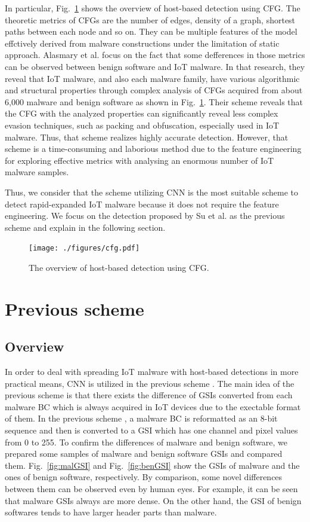 \documentclass{ieeeaccess}
\newcommand{\myfigurename}{Fig.}
\begin{document}
In particular, \myfigurename~\ref{fig:cfg} shows the overview of host-based detection using CFG.
The theoretic metrics of CFGs are the number of edges, density of a graph, shortest paths between each node and so on.
They can be multiple features of the model effctively derived from malware constructions under the limitation of static approach.
Alasmary et al. \cite{cfg} focus on the fact that some defferences in those metrics can be observed between benign software and IoT malware.
In that research, they reveal that IoT malware, and also each malware family, have various algorithmic and structural properties through complex analysis of CFGs acquired from about 6,000 malware and benign software as shown in \myfigurename~\ref{fig:cfg}.
Their scheme reveals that the CFG with the analyzed properties can significantly reveal less complex evasion techniques, such as packing and obfuscation, especially used in IoT malware.
Thus, that scheme realizes highly accurate detection.
However, that scheme is a time-consuming and laborious method due to the feature engineering for exploring effective metrics with analysing an enormous number of IoT malware samples.

Thus, we consider that the scheme utilizing CNN is the most suitable scheme to detect rapid-expanded IoT malware because it does not require the feature engineering.
We focus on the detection proposed by Su et al. \cite{previous} as the previous scheme and explain in the following section.
\begin{figure}[t]
 \centering
 \texttt{[image: ./figures/cfg.pdf]}
 \caption{The overview of host-based detection using CFG.} 
 \label{fig:cfg}
\end{figure}

\section{Previous scheme} \label{sec:previous_scheme}
\subsection{Overview} 
In order to deal with spreading IoT malware with host-based detections in more practical means, CNN is utilized in the previous scheme \cite{previous}.
The main idea of the previous scheme is that there exists the difference of GSIs converted from each malware BC which is always acquired in IoT devices due to the exectable format of them.
In the previous scheme \cite{previous}, a malware BC is reformatted as an 8-bit sequence and then is converted to a GSI which has one channel and pixel values from 0 to 255.
To confirm the differences of malware and benign software, we prepared some samples of malware and benign software GSIs and compared them.
\myfigurename~\ref{fig:malGSI} and \myfigurename~\ref{fig:benGSI} show the GSIs of malware and the ones of benign software, respectively.
By comparison, some novel differences between them can be observed even by human eyes.
For example, it can be seen that malware GSIs always are more dense.
On the other hand, the GSI of benign softwares tends to have larger header parts than malware.
\end{document}

